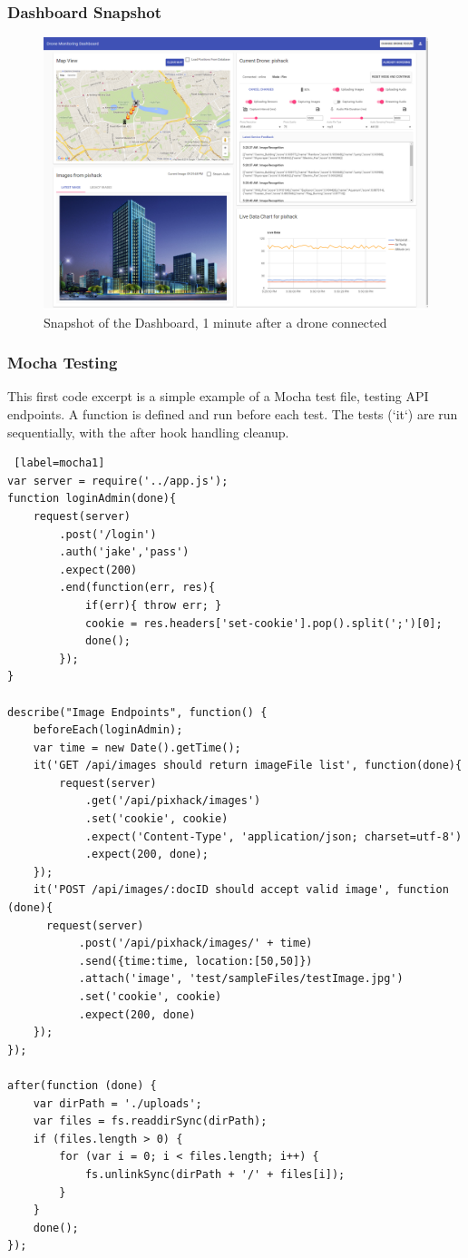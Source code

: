 \documentclass{article}
\begin{document}
\subsubsection{Dashboard Snapshot}\label{DashboardSnapshots}
\begin{figure}[h]
\centering
\caption{Snapshot of the Dashboard, 1 minute after a drone connected}
\includegraphics[width=\linewidth]{Dashboard}
\end{figure}



\subsubsection{Mocha Testing}
This first code excerpt is a simple example of a Mocha test file, testing API endpoints. A function is defined and run before each test. The tests (`it`) are run sequentially, with the after hook handling cleanup.
\begin{lstlisting} [label=mocha1]
var server = require('../app.js');
function loginAdmin(done){
	request(server)
		.post('/login')
		.auth('jake','pass')
		.expect(200)
		.end(function(err, res){
			if(err){ throw err; }
			cookie = res.headers['set-cookie'].pop().split(';')[0];
			done();
		});
}

describe("Image Endpoints", function() {
	beforeEach(loginAdmin); 	
	var time = new Date().getTime();
	it('GET /api/images should return imageFile list', function(done){
		request(server)
			.get('/api/pixhack/images')
			.set('cookie', cookie)
			.expect('Content-Type', 'application/json; charset=utf-8')
			.expect(200, done);
	});
	it('POST /api/images/:docID should accept valid image', function (done){
	  request(server)
		   .post('/api/pixhack/images/' + time)
		   .send({time:time, location:[50,50]})
		   .attach('image', 'test/sampleFiles/testImage.jpg')
		   .set('cookie', cookie)
		   .expect(200, done)
	});
});

after(function (done) {
	var dirPath = './uploads';
	var files = fs.readdirSync(dirPath);
	if (files.length > 0) {
		for (var i = 0; i < files.length; i++) {
			fs.unlinkSync(dirPath + '/' + files[i]);
		}
	}
	done();
});
\end{lstlisting}
\end{document}

